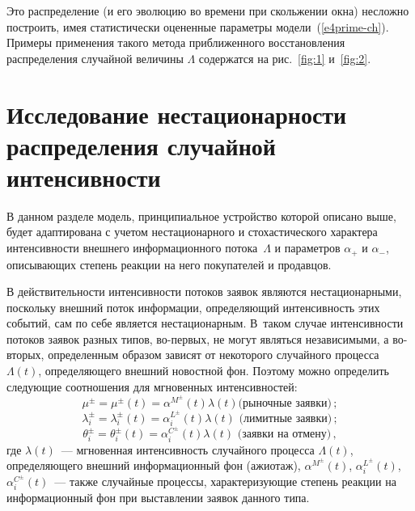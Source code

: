 \begin{multicols}{2}

\noindent
Это распределение (и его эволюцию во времени при скольжении окна)
несложно построить, имея статистически оцененные параметры модели~(\ref{e4prime-ch}). 
Примеры применения такого метода приближенного восстановления
распределения случайной величины $\Lambda$ содержатся на рис.~\ref{fig:1} и~\ref{fig:2}.



\section{Исследование нестационарности распределения случайной интенсивности}

В данном разделе модель, принципиальное устройство которой описано
выше, будет адаптирована с учетом нестационарного и стохастического
характера интенсивности внешнего информационного потока~$\Lambda$ и
параметров $\alpha_+$ и $\alpha_-$, описывающих степень реакции на
него покупателей и продавцов.

В действительности интенсивности потоков \mbox{заявок} являются
нестационарными, поскольку внешний поток информации, определяющий
интенсивность этих событий, сам по себе является нестационарным. 
В~таком случае интенсивности потоков заявок разных типов, во-пер\-вых,
не могут являться независимыми, а во-вто\-рых, определенным образом
зависят от некоторого случайного процесса~$\Lambda(t)$,
определяющего внешний новостной фон. Поэтому можно определить
следующие соотношения для мгновенных интенсивностей:
$$
\mu^{\pm} = \mu^{\pm}(t) = \alpha^{M^{\pm}}(t) \lambda(t) \mbox{
(рыночные заявки)}\,;
$$
$$
\lambda_i^{\pm} = \lambda_i^{\pm}(t) = \alpha_i^{L^{\pm}}(t)
\lambda(t) \mbox{ (лимитные заявки)}\,;
$$
$$
\theta_i^{\pm} = \theta_i^{\pm}(t) = \alpha_i^{C^{\pm}}(t)
\lambda(t) \mbox{ (заявки на отмену)}\,,
$$
где $\lambda(t)$~--- мгновенная интенсивность случайного процесса
$\Lambda(t)$, определяющего внешний информационный фон (ажиотаж),
$\alpha^{M^{\pm}}(t)$, $\alpha_i^{L^{\pm}}(t)$,
$\alpha_i^{C^{\pm}}(t)$~--- также случайные процессы, характеризующие\linebreak
степень реакции на информационный фон при выставлении заявок данного
типа.


\end{multicols}
